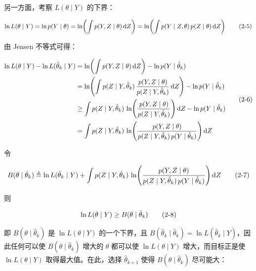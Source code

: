 \documentclass[12pt,a4paper]{ctexart}
\makeatletter
\numberwithin{figure}{section}
\numberwithin{table}{section}
\let\ltx@orig@tag\tag
\renewcommand{\tag}[1]{\refstepcounter{equation}\ltx@orig@tag{#1}}%
\makeatother
\begin{document}
另一方面，考察 $L(\theta\mid Y)$ 的下界：

\begin{equation}
\ln L(\theta\mid Y) = \ln p(Y\mid\theta) = \ln\!\left( \int p(Y,Z\mid\theta)\, \mathrm{d}Z \right) = \ln\!\left( \int p(Y\mid Z,\theta)\, p(Z\mid\theta)\, \mathrm{d}Z \right) \tag{2-5}
\end{equation}

由 Jensen 不等式可得：

\begin{equation}
\begin{aligned}
\ln L(\theta\mid Y) - \ln L(\hat{\theta}_k\mid Y) &= \ln\!\left( \int p(Y,Z\mid\theta)\, \mathrm{d}Z \right) - \ln p(Y\mid\hat{\theta}_k) \\
&= \ln\!\left( \int p(Z\mid Y,\hat{\theta}_k)\, \frac{p(Y,Z\mid\theta)}{p(Z\mid Y,\hat{\theta}_k)}\, \mathrm{d}Z \right) - \ln p(Y\mid\hat{\theta}_k) \\
&\geq \int p(Z\mid Y,\hat{\theta}_k)\, \ln\!\left( \frac{p(Y,Z\mid\theta)}{p(Z\mid Y,\hat{\theta}_k)} \right) \mathrm{d}Z - \ln p(Y\mid\hat{\theta}_k) \\
&= \int p(Z\mid Y,\hat{\theta}_k)\, \ln\!\left( \frac{p(Y,Z\mid\theta)}{p(Z\mid Y,\hat{\theta}_k)\, p(Y\mid\hat{\theta}_k)} \right) \mathrm{d}Z
\end{aligned} \tag{2-6}
\end{equation}

令

\begin{equation}
B(\theta\mid\hat{\theta}_k) \triangleq \ln L(\hat{\theta}_k\mid Y) + \int p(Z\mid Y,\hat{\theta}_k)\, \ln\!\left( \frac{p(Y,Z\mid\theta)}{p(Z\mid Y,\hat{\theta}_k)\, p(Y\mid\hat{\theta}_k)} \right) \mathrm{d}Z \tag{2-7}
\end{equation}

则

\begin{equation}
\ln L(\theta\mid Y) \geq B(\theta\mid\hat{\theta}_k) \tag{2-8}
\end{equation}

即 $B(\theta\mid\hat{\theta}_k)$ 是 $\ln L(\theta\mid Y)$ 的一个下界，且 $B(\hat{\theta}_k\mid\hat{\theta}_k) = \ln L(\hat{\theta}_k\mid Y)$，因此任何可以使 $B(\theta\mid\hat{\theta}_k)$ 增大的 $\theta$ 都可以使 $\ln L(\theta\mid Y)$ 增大，而目标正是使 $\ln L(\theta\mid Y)$ 取得最大值。在此，选择 $\hat{\theta}_{k+1}$ 使得 $B(\theta\mid\hat{\theta}_k)$ 尽可能大：
\end{document}
